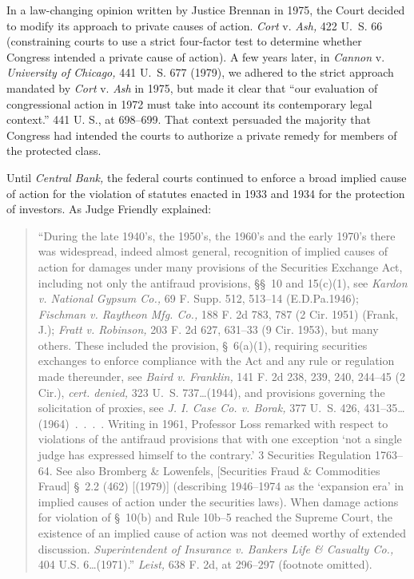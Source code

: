   In a law-changing opinion written by Justice Brennan in 1975, the Court decided to modify its approach to private causes of action. \emph{Cort} v. \emph{Ash,} 422 U.~S. 66 (constraining courts to use a strict four-factor test to determine whether Congress intended a private cause of action). A few years later, in \emph{Cannon} v. \emph{University of Chicago,} 441 U.~S. 677 (1979), we adhered to the strict approach mandated by \emph{Cort} v. \emph{Ash} in 1975, but made it clear that ``our evaluation of congressional action in 1972 must take into account its contemporary legal context.'' 441 U. S., at 698--699. That context persuaded the majority that Congress had intended the courts to authorize a private remedy for members of the protected class.

  Until \emph{Central Bank,} the federal courts continued to enforce a broad implied cause of action for the violation of statutes enacted in 1933 and 1934 for the protection of investors. As Judge Friendly explained:

      \begin{quote}

		  \newpage  ``During the late 1940's, the 1950's, the 1960's and the early 1970's there was widespread, indeed almost general, recognition of implied causes of action for damages under many provisions of the Securities Exchange Act, including not only the antifraud provisions, \S\S~10 and 15(c)(1), see \emph{Kardon v. National Gypsum Co.,} 69 F. Supp. 512, 513--14 (E.D.Pa.1946); \emph{Fischman v. Raytheon Mfg. Co.,} 188 F. 2d 783, 787 (2 Cir. 1951) (Frank, J.); \emph{Fratt v. Robinson,} 203 F. 2d 627, 631--33 (9 Cir. 1953), but many others. These included the provision, \S~6(a)(1), requiring securities exchanges to enforce compliance with the Act and any rule or regulation made thereunder, see \emph{Baird v. Franklin,} 141 F. 2d 238, 239, 240, 244--45 (2 Cir.), \emph{cert. denied,} 323 U.~S. 737\dots (1944), and provisions governing the solicitation of proxies, see \emph{J. I. Case Co. v. Borak,} 377 U.~S. 426, 431--35\dots (1964)~.~.~.~. Writing in 1961, Professor Loss remarked with respect to violations of the antifraud provisions that with one exception ‘not a single judge has expressed himself to the contrary.' 3 Securities Regulation 1763--64. See also Bromberg \& Lowenfels, [Securities Fraud \& Commodities Fraud] \S~2.2 (462) [(1979)] (describing 1946--1974 as the ‘expansion era' in implied causes of action under the securities laws). When damage actions for violation of \S~10(b) and Rule 10b--5 reached the Supreme Court, the existence of an implied cause of action was not deemed worthy of extended discussion. \emph{Superintendent of Insurance v. Bankers Life \& Casualty Co.,} 404 U.S. 6\dots (1971).'' \emph{Leist,} 638 F. 2d, at 296--297 (footnote omitted).

      \end{quote}

